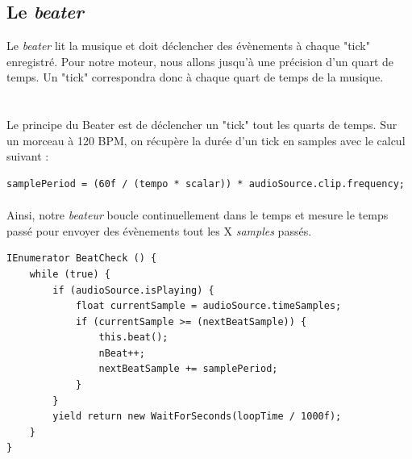 \subsection{Le \textit{beater}}
Le \textit{beater} lit la musique et doit déclencher des évènements à chaque "tick" enregistré. Pour notre moteur, nous allons jusqu'à une précision d'un quart de temps. Un "tick" correspondra donc à chaque quart de temps de la musique.\\

\\\\

Le principe du Beater est de déclencher un "tick" tout les quarts de temps. Sur un morceau à 120 BPM, on récupère la durée d’un tick en samples avec le calcul suivant :

\begin{lstlisting}
samplePeriod = (60f / (tempo * scalar)) * audioSource.clip.frequency;
\end{lstlisting}

\paragraph{}

Ainsi, notre \textit{beateur} boucle continuellement dans le temps et mesure le temps passé pour envoyer des évènements tout les X \textit{samples} passés.

\begin{lstlisting}
IEnumerator BeatCheck () {
    while (true) {
        if (audioSource.isPlaying) {
            float currentSample = audioSource.timeSamples;
            if (currentSample >= (nextBeatSample)) {
                this.beat();
                nBeat++;
                nextBeatSample += samplePeriod;
            }
        }
        yield return new WaitForSeconds(loopTime / 1000f);
    }
}
\end{lstlisting}

